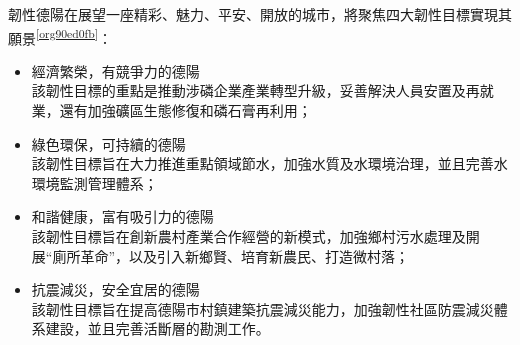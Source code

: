 \documentclass[a4paper,12pt]{article}
\begin{document}
\begin{enumerate}
韌性德陽在展望一座精彩、魅力、平安、開放的城市，將聚焦四大韌性目標實現其願景\textsuperscript{\ref{org90ed0fb}}：\\
\begin{itemize}
\item 經濟繁榮，有競爭力的德陽\\
該韌性目標的重點是推動涉磷企業產業轉型升級，妥善解決人員安置及再就業，還有加強礦區生態修復和磷石膏再利用；\\
\item 綠色環保，可持續的德陽\\
該韌性目標旨在大力推進重點領域節水，加強水質及水環境治理，並且完善水環境監測管理體系；\\
\item 和諧健康，富有吸引力的德陽\\
該韌性目標旨在創新農村產業合作經營的新模式，加強鄉村污水處理及開展``廁所革命''，以及引入新鄉賢、培育新農民、打造微村落；\\
\item 抗震減災，安全宜居的德陽\\
該韌性目標旨在提高德陽市村鎮建築抗震減災能力，加強韌性社區防震減災體系建設，並且完善活斷層的勘測工作。\\
\end{itemize}
\newpage
\end{enumerate}
\end{document}
